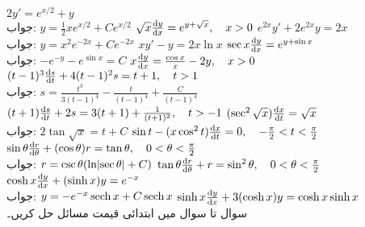 $2y'=e^{x/2}+y$\\
جواب:\quad
$y=\tfrac{1}{2}xe^{x/2}+Ce^{x/2}$
$\sqrt{x}\frac{\dif y}{\dif x}=e^{y+\sqrt{x}},\quad x>0$
$e^{2x}y'+2e^{2x}y=2x$\\
جواب:\quad
$y=x^2e^{-2x}+Ce^{-2x}$
$xy'-y=2x\ln x$
$\sec x\frac{\dif y}{\dif x}=e^{y+\sin x}$\\
جواب:\quad
$-e^{-y}-e^{\sin x}=C$
$x\frac{\dif y}{\dif x}=\frac{\cos x}{x}-2y,\quad x>0$
$(t-1)^3\frac{\dif s}{\dif t}+4(t-1)^2s=t+1,\quad t>1$\\
جواب:\quad
$s=\tfrac{t^3}{3(t-1)^4}-\tfrac{t}{(t-1)^4}+\tfrac{C}{(t-1)^4}$
$(t+1)\frac{\dif s}{\dif t}+2s=3(t+1)+\frac{1}{(t+1)^2},\quad t>-1$
$(\sec^2\sqrt{x})\frac{\dif x}{\dif t}=\sqrt{x}$\\
جواب:\quad
$2\tan\sqrt{x}=t+C$
$\sin t-(x\cos^2t)\frac{\dif x}{\dif t}=0,\quad -\frac{\pi}{2}<t<\frac{\pi}{2}$
$\sin\theta\frac{\dif r}{\dif\theta}+(\cos\theta)r=\tan\theta,\quad 0<\theta<\frac{\pi}{2}$\\
جواب:\quad
$r=\csc\theta(\ln\abs{\sec\theta}+C)$
$\tan\theta\frac{\dif r}{\dif \theta}+r=\sin^2\theta,\quad 0<\theta<\frac{\pi}{2}$
$\cosh x \frac{\dif y}{\dif x}+(\sinh x)y=e^{-x}$\\
جواب:\quad
$y=-e^{-x}\operatorname{sech} x+C\operatorname{sech} x$
$\sinh x\frac{\dif y}{\dif x}+3(\cosh x)y=\cosh x\sinh x$
\\
سوال  تا سوال  میں ابتدائی قیمت مسائل حل کریں۔ 

